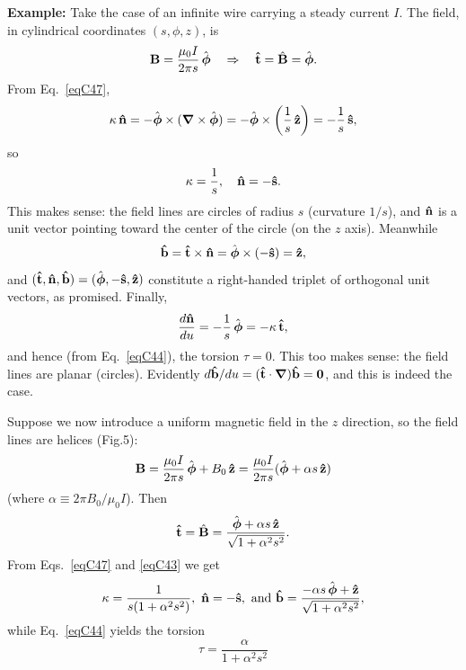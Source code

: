 \documentclass[aps,prb,twocolumn,groupedaddress,noshowpacs,checklength,amsmath]{revtex4-1}
\newcommand{\grad}{\mbox{\boldmath $\nabla$}}
\def\zhat{{\bf \hat z}}
\def\phat{{\hat{\mbox{\boldmath$\phi$}}}}
\def\nhat{{\bf \hat n}}
\def\that{{\bf \hat t}}
\def\bhat{{\bf \hat b}}
\def\shat{{\bf \hat s}}
\begin{document}
{\bf Example:}  Take the case of an infinite wire carrying a steady current $I$.  The field, in cylindrical coordinates $(s, \phi, z)$, is
\begin{equation}
{\bf B}= \frac{\mu_0I}{2\pi s}\,\phat\quad \Rightarrow\quad \that = \hat{\bf B} = \phat.\label{eqC48}
\end{equation}
From Eq.~\ref{eqC47},
\begin{equation}
\kappa\,\nhat =  -\phat \times(\grad\times \phat) =-\phat \times\left(\frac{1}{s}\,\zhat\right)  = -\frac{1}{s}\,\shat,\label{eqC49}
\end{equation}
so 
\begin{equation}
\kappa = \frac{1}{s},\quad \nhat = -\shat.\label{eqC50}
\end{equation}
This makes sense: the field lines are circles of radius $s$ (curvature $1/s$), and $\nhat$ is a unit vector pointing toward the center of the circle (on the $z$ axis).  Meanwhile
\begin{equation}
\bhat = \that \times \nhat = \phat \times (-\shat) = \zhat,\label{eqC51}
\end{equation}
and $(\that, \nhat,\bhat) = (\phat, -\shat, \zhat)$ constitute a right-handed triplet of orthogonal unit vectors, as promised.  Finally, 
\begin{equation}
\frac{d\nhat}{du} = -\frac{1}{s}\,\phat = -\kappa\,\that,\label{eqC52}
\end{equation}
and hence (from Eq.~\ref{eqC44}), the torsion $\tau = 0$.  This too makes sense: the field lines are planar (circles).  Evidently $d\bhat/du=(\that\cdot \grad)\bhat={\bf 0}$, and this is indeed the case.

Suppose we now introduce a uniform magnetic field in the $z$ direction, so the field lines are helices (Fig.5):
\begin{equation}
{\bf B} = \frac{\mu_0I}{2\pi s}\,\phat + B_0\,\zhat = \frac{\mu_0 I}{2\pi s}(\phat + \alpha s\,\zhat)\label{eq30}
\end{equation}
(where $\alpha \equiv 2\pi B_0/\mu_0I$).  Then
\begin{equation}
\that = \hat{\bf B} = \frac{\phat + \alpha s\,\zhat}{\sqrt{1+\alpha^2s^2}}.\label{eqC53}
\end{equation}
From Eqs.~\ref{eqC47} and \ref{eqC43} we get
\begin{equation}
\kappa = \frac{1}{s(1+\alpha^2s^2)}, \ \nhat = -\shat,\  {\rm and}\  \bhat = \frac{-\alpha s\,\phat +\zhat}{\sqrt{1+\alpha^2s^2}},\label{eqC55}
\end{equation}
while Eq.~\ref{eqC44} yields the torsion
\begin{equation}
\tau = \frac{\alpha}{1+\alpha^2s^2}\label{eqC56}
\end{equation}
\end{document}
